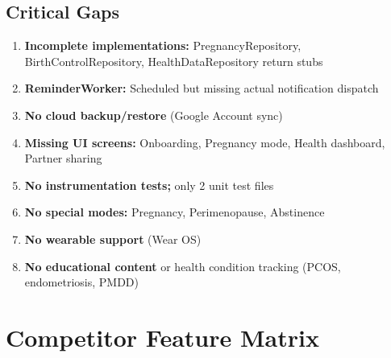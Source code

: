 \documentclass[12pt,a4paper]{article}
\begin{document}
\subsection{Critical Gaps}
\begin{enumerate}[leftmargin=1.5em]
  \item \textbf{Incomplete implementations:} PregnancyRepository, BirthControlRepository, HealthDataRepository return stubs
  \item \textbf{ReminderWorker:} Scheduled but missing actual notification dispatch
  \item \textbf{No cloud backup/restore} (Google Account sync)
  \item \textbf{Missing UI screens:} Onboarding, Pregnancy mode, Health dashboard, Partner sharing
  \item \textbf{No instrumentation tests;} only 2 unit test files
  \item \textbf{No special modes:} Pregnancy, Perimenopause, Abstinence
  \item \textbf{No wearable support} (Wear OS)
  \item \textbf{No educational content} or health condition tracking (PCOS, endometriosis, PMDD)
\end{enumerate}

\section{Competitor Feature Matrix}
\end{document}
